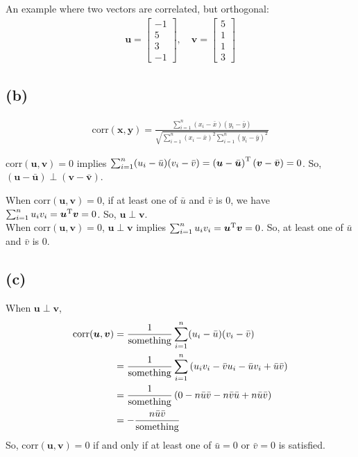 \documentclass[a4paper]{article}
\begin{document}
An example where two vectors are correlated, but orthogonal:
\begin{align*}
\bm{u} = 
\begin{bmatrix}
-1\\
5\\
3\\
-1
\end{bmatrix}
, \quad
\bm{v} = 
\begin{bmatrix}
5\\
1\\
1\\
3
\end{bmatrix}
\end{align*}

\subsection{(b)}
\begin{align*}
\mathrm{corr}(\bm{x},\bm{y}) = \frac{\sum \limits _{i=1}^{n}(x_{i}-\bar{x})(y_{i}-\bar{y})}{\sqrt {\sum \limits _{i=1}^{n}(x_{i}-\bar {x})^{2}\sum \limits _{i=1}^{n}(y_{i}-\bar {y})^{2}}}
\end{align*}

$\mathrm{corr}(\bm{u},\bm{v}) = 0$ implies $\sum_{i=1}^{n}(u_{i}-\bar{u})(v_{i}-\bar{v}) = \left(\bm{u}-\bar{\bm{u}}\right)^{\rm T}\left(\bm{v}-\bar{\bm{v}}\right) = 0$. So, $\left(\bm{u}-\bar{\bm{u}}\right) \perp \left(\bm{v}-\bar{\bm{v}}\right)$.

When $\mathrm{corr}(\bm{u},\bm{v}) = 0$, if at least one of $\bar{u}$ and $\bar{v}$ is $0$, we have $\sum_{i=1}^{n}u_{i}v_{i} = \bm{u}^{\rm T}\bm{v} = 0$. So, $\bm{u} \perp \bm{v}$.\\
When $\mathrm{corr}(\bm{u},\bm{v}) = 0$, $\bm{u} \perp \bm{v}$ implies $\sum_{i=1}^{n}u_{i}v_{i} = \bm{u}^{\rm T}\bm{v} = 0$. So, at least one of $\bar{u}$ and $\bar{v}$ is $0$.

\subsection{(c)}
When $\bm{u} \perp \bm{v}$,
\begin{align*}
\mathrm{corr}(\bm{u},\bm{v})
&= \frac{1}{\rm{something}}\sum_{i=1}^{n}(u_{i}-\bar{u})(v_{i}-\bar{v})\\
&= \frac{1}{\rm{something}}\sum_{i=1}^{n}\left(u_{i}v_{i} -\bar{v}u_{i}-\bar{u}v_{i}+\bar{u}\bar{v} \right)\\
&= \frac{1}{\rm{something}}\left(0 -n\bar{u}\bar{v} -n\bar{v}\bar{u} +n\bar{u}\bar{v} \right)\\
&= -\frac{n\bar{u}\bar{v}}{\rm{something}}
\end{align*}
So, $\mathrm{corr}(\bm{u},\bm{v}) = 0$ if and only if at least one of $\bar{u} = 0$ or $\bar{v} = 0$ is satisfied.
\end{document}
